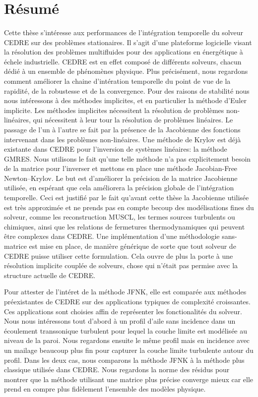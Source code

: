 \section{Résumé}

\paragraph{}
Cette thèse s'intéresse aux performances de l'intégration temporelle du solveur CEDRE sur des problèmes stationaires.
Il s'agit d'une plateforme logicielle visant la résolution des problèmes multifluides pour des applications en énergétique à échele industrielle.
CEDRE est en effet composé de différents solveurs, chacun dédié à un ensemble de phénomènes physique.
Plus précisément, nous regardons comment améliorer la chaine d'intération temporelle du point de vue de la rapidité, de la robustesse et de la convergence.
Pour des raisons de stabilité nous nous intéressons à des méthodes implicites, et en particulier la méthode d'Euler implicite.
Les méthodes implicites nécessitent la résolution de problèmes non-linéaires, qui nécessitent à leur tour la résolution de problèmes linéaires.
Le passage de l'un à l'autre se fait par la présence de la Jacobienne des fonctions intervenant dans les problèmes non-linéaires.
Une méthode de Krylov est déjà existante dans CEDRE pour l'inversion de systèmes linéaires: la méthode GMRES.
Nous utilisons le fait qu'une telle méthode n'a pas explicitement besoin de la matrice pour l'inverser et mettons en place une méthode Jacobian-Free Newton--Krylov.
Le but est d'améliorer la précision de la matrice Jacobienne utilisée, en espérant que cela améliorera la précision globale de l'intégration temporelle.
Ceci est justifié par le fait qu'avant cette thèse la Jacobienne utilisée est très approximée et ne prends pas en compte becoup des modélisations fines du solveur, comme les reconstruction MUSCL, les termes sources turbulents ou chimiques, ainsi que les relations de fermetures thermodynamiques qui peuvent être complexes dans CEDRE.
Une implémentation d'une méthodologie sans-matrice est mise en place, de manière générique de sorte que tout solveur de CEDRE puisse utiliser cette formulation.
Cela ouvre de plus la porte à une résolution implicite couplée de solveurs, chose qui n'était pas permise avec la structure actuelle de CEDRE.

Pour attester de l'intéret de la méthode JFNK, elle est comparée aux méthodes préexistantes de CEDRE sur des applications typiques de complexité croissantes.
Ces applications sont choisies affin de représenter les fonctionalités du solveur.
Nous nous intéressons tout d'abord à un profil d'aile sans incidence dans un écoulement transsonique turbulent pour lequel la couche limite est modélisée au niveau de la paroi.
Nous regardons ensuite le même profil mais en incidence avec un mailage beaucoup plus fin pour capturer la couche limite turbulente autour du profil.
Dans les deux cas, nous comparons la méthode JFNK à la méthode plus classique utilisée dans CEDRE.
Nous regardons la norme des résidus pour montrer que la méthode utilisant une matrice plus précise converge mieux car elle prend en compre plus fidèlement l'ensemble des modèles physique.


